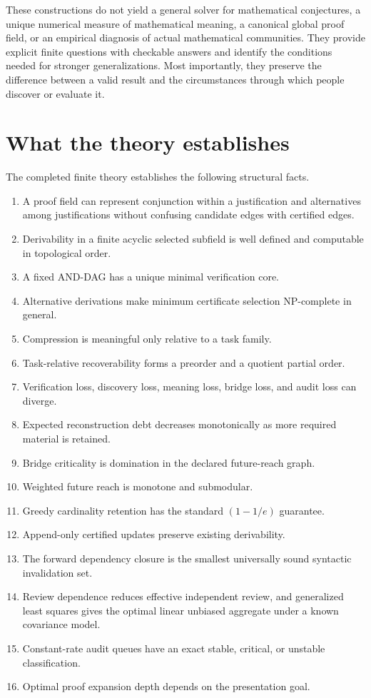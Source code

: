 \documentclass[11pt,oneside]{article}
\theoremstyle{definition}
\theoremstyle{remark}
\begin{document}
These constructions do not yield a general solver for mathematical conjectures, a unique numerical measure of mathematical meaning, a canonical global proof field, or an empirical diagnosis of actual mathematical communities. They provide explicit finite questions with checkable answers and identify the conditions needed for stronger generalizations. Most importantly, they preserve the difference between a valid result and the circumstances through which people discover or evaluate it.


\section{What the theory establishes}

The completed finite theory establishes the following structural facts.

\begin{enumerate}
\item A proof field can represent conjunction within a justification and alternatives among justifications without confusing candidate edges with certified edges.
\item Derivability in a finite acyclic selected subfield is well defined and computable in topological order.
\item A fixed AND-DAG has a unique minimal verification core.
\item Alternative derivations make minimum certificate selection NP-complete in general.
\item Compression is meaningful only relative to a task family.
\item Task-relative recoverability forms a preorder and a quotient partial order.
\item Verification loss, discovery loss, meaning loss, bridge loss, and audit loss can diverge.
\item Expected reconstruction debt decreases monotonically as more required material is retained.
\item Bridge criticality is domination in the declared future-reach graph.
\item Weighted future reach is monotone and submodular.
\item Greedy cardinality retention has the standard $(1-1/e)$ guarantee.
\item Append-only certified updates preserve existing derivability.
\item The forward dependency closure is the smallest universally sound syntactic invalidation set.
\item Review dependence reduces effective independent review, and generalized least squares gives the optimal linear unbiased aggregate under a known covariance model.
\item Constant-rate audit queues have an exact stable, critical, or unstable classification.
\item Optimal proof expansion depth depends on the presentation goal.
\end{enumerate}
\end{document}
